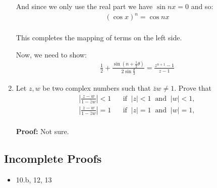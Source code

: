 \begin{enumerate}
	And since we only use the real part we have $\sin nx = 0$ and so:
	\begin{align*}
		\left( \cos x \right)^n = \cos nx \\
	\end{align*}

	This completes the mapping of terms on the left side.

	Now, we need to show:
	\begin{align*}
		\frac{1}{2} + \frac{\sin (n + \frac{1}{2}\theta)}{2 \sin \frac{\theta}{2}} = \frac{z^{n + 1} - 1}{z - 1}
	\end{align*}

	\item Let $z, w$ be two complex numbers such that $\bar{z}w \neq 1.$ Prove that
	\begin{align*}
		\left| \frac{z - w}{1 - \bar{z}w} \right| < 1 \;\;\;\;\;\; \text{if} \;\; |z| < 1 \;\; \text{and} \;\; |w| < 1, \\
		\left| \frac{z - w}{1 - \bar{z}w} \right| = 1 \;\;\;\;\;\; \text{if} \;\; |z| = 1 \;\; \text{and} \;\; |w| = 1, \\
	\end{align*}
	
	\textbf{Proof:}
	Not sure.

\end{enumerate}

\subsection{Incomplete Proofs}
\begin{itemize}
	\item 10.b, 12, 13
\end{itemize}
